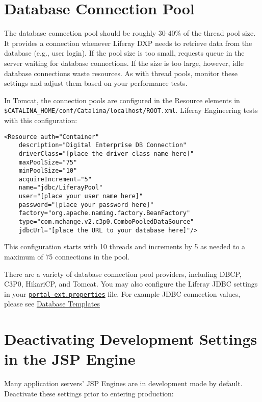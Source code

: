 \section{Database Connection Pool}\label{database-connection-pool}

The database connection pool should be roughly 30-40\% of the thread
pool size. It provides a connection whenever Liferay DXP needs to
retrieve data from the database (e.g., user login). If the pool size is
too small, requests queue in the server waiting for database
connections. If the size is too large, however, idle database
connections waste resources. As with thread pools, monitor these
settings and adjust them based on your performance tests.

In Tomcat, the connection pools are configured in the Resource elements
in \texttt{\$CATALINA\_HOME/conf/Catalina/localhost/ROOT.xml}. Liferay
Engineering tests with this configuration:

\begin{verbatim}
<Resource auth="Container"         
    description="Digital Enterprise DB Connection"   
    driverClass="[place the driver class name here]"   
    maxPoolSize="75"   
    minPoolSize="10"           
    acquireIncrement="5"   
    name="jdbc/LiferayPool"  
    user="[place your user name here]"   
    password="[place your password here]"           
    factory="org.apache.naming.factory.BeanFactory"
    type="com.mchange.v2.c3p0.ComboPooledDataSource"
    jdbcUrl="[place the URL to your database here]"/>
\end{verbatim}

This configuration starts with 10 threads and increments by 5 as needed
to a maximum of 75 connections in the pool.

There are a variety of database connection pool providers, including
DBCP, C3P0, HikariCP, and Tomcat. You may also configure the Liferay
JDBC settings in your
\href{https://docs.liferay.com/ce/portal/7.2-latest/propertiesdoc/portal.properties.html}{\texttt{portal-ext.properties}}
file. For example JDBC connection values, please see
\href{/docs/7-2/deploy/-/knowledge_base/d/database-templates}{Database
Templates}

\section{Deactivating Development Settings in the JSP
Engine}\label{deactivating-development-settings-in-the-jsp-engine}

Many application servers' JSP Engines are in development mode by
default. Deactivate these settings prior to entering production:


